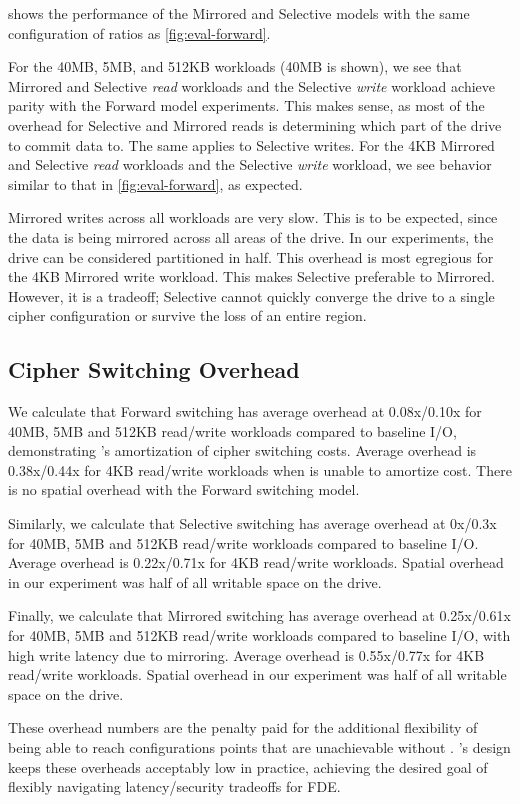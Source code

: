 

 shows the performance of the Mirrored and Selective models
with the same configuration of ratios as \cref{fig:eval-forward}.

For the 40MB, 5MB, and 512KB workloads (40MB is shown), we see that Mirrored and
Selective {\em read} workloads and the Selective {\em write} workload achieve
parity with the Forward model experiments. This makes sense, as most of the
overhead for Selective and Mirrored reads is determining which part of the drive
to commit data to. The same applies to Selective writes. For the 4KB Mirrored
and Selective {\em read} workloads and the Selective {\em write} workload, we
see behavior similar to that in \cref{fig:eval-forward}, as expected.

Mirrored writes across all workloads are very slow. This is to be expected,
since the data is being mirrored across all areas of the drive. In our
experiments, the drive can be considered partitioned in half. This overhead is
most egregious for the 4KB Mirrored write workload. This makes Selective
preferable to Mirrored. However, it is a tradeoff; Selective cannot quickly
converge the drive to a single cipher configuration or survive the loss of an
entire region.


\subsection{Cipher Switching Overhead}\label{subsec:eval-overhead}

We calculate that Forward switching has average overhead at 0.08x/0.10x for
40MB, 5MB and 512KB read/write workloads compared to baseline I/O, demonstrating
\sys's amortization of cipher switching costs. Average overhead is\\0.38x/0.44x
for 4KB read/write workloads when \sys is unable to amortize cost. There is no
spatial overhead with the Forward switching model.

Similarly, we calculate that Selective switching has average overhead at 0x/0.3x
for 40MB, 5MB and 512KB read/write workloads compared to baseline I/O. Average
overhead is 0.22x/0.71x for 4KB read/write workloads. Spatial overhead in our
experiment was half of all writable space on the drive.

Finally, we calculate that Mirrored switching has average overhead at
0.25x/0.61x for 40MB, 5MB and 512KB read/write workloads compared to baseline
I/O, with high write latency due to mirroring. Average overhead is 0.55x/0.77x
for 4KB read/write workloads. Spatial overhead in our experiment was half of all
writable space on the drive.

These overhead numbers are the penalty paid for the additional flexibility of
being able to reach configurations points that are unachievable without \sys.
\sys's design keeps these overheads acceptably low in practice, achieving the
desired goal of flexibly navigating latency/security tradeoffs for FDE.
